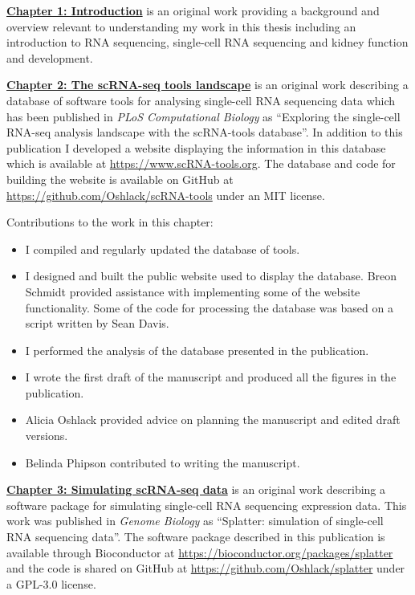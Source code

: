 \documentclass[11pt,a4paper,titlepage,twoside,openright]{style/unimelbthesis}
\theoremstyle{definition}
\theoremstyle{definition}
\theoremstyle{definition}
\theoremstyle{remark}
\begin{document}
\begin{frontmatter}
\begin{preface}
    \textbf{\protect\hyperlink{introduction}{Chapter 1: Introduction}} is an original work providing a background and overview relevant to understanding my work in this thesis including an introduction to RNA sequencing, single-cell RNA sequencing and kidney function and development.
    
    \textbf{\protect\hyperlink{tools}{Chapter 2: The scRNA-seq tools landscape}} is an original work describing a database of software tools for analysing single-cell RNA sequencing data which has been published in \emph{PLoS Computational Biology} as ``Exploring the single-cell RNA-seq analysis landscape with the scRNA-tools database''. In addition to this publication I developed a website displaying the information in this database which is available at \url{https://www.scRNA-tools.org}. The database and code for building the website is available on GitHub at \url{https://github.com/Oshlack/scRNA-tools} under an MIT license.
    
    Contributions to the work in this chapter:
    
    \begin{itemize}
    \item
      I compiled and regularly updated the database of tools.
    \item
      I designed and built the public website used to display the database. Breon Schmidt provided assistance with implementing some of the website functionality. Some of the code for processing the database was based on a script written by Sean Davis.
    \item
      I performed the analysis of the database presented in the publication.
    \item
      I wrote the first draft of the manuscript and produced all the figures in the publication.
    \item
      Alicia Oshlack provided advice on planning the manuscript and edited draft versions.
    \item
      Belinda Phipson contributed to writing the manuscript.
    \end{itemize}
    
    \textbf{\protect\hyperlink{simulation}{Chapter 3: Simulating scRNA-seq data}} is an original work describing a software package for simulating single-cell RNA sequencing expression data. This work was published in \emph{Genome Biology} as ``Splatter: simulation of single-cell RNA sequencing data''. The software package described in this publication is available through Bioconductor at \url{https://bioconductor.org/packages/splatter} and the code is shared on GitHub at \url{https://github.com/Oshlack/splatter} under a GPL-3.0 license.
    

\end{preface}
\end{frontmatter}
\end{document}
